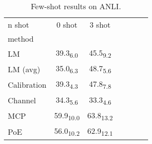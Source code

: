 \begin{table}[h]
\centering
\caption{Few-shot results on ANLI.}
\label{tab:few_shot}
\begin{tabular}{lcccccc}
n shot & 0 shot & 3 shot \\
method &  &  \\
LM & 39.3\textsubscript{6.0} & 45.5\textsubscript{9.2} \\
LM (avg) & 35.0\textsubscript{6.3} & 48.7\textsubscript{5.6} \\
Calibration & 39.3\textsubscript{4.3} & 47.8\textsubscript{7.8} \\
Channel & 34.3\textsubscript{5.6} & 33.3\textsubscript{4.6} \\
MCP & 59.9\textsubscript{10.0} & 63.8\textsubscript{13.2} \\
PoE & 56.0\textsubscript{10.2} & 62.9\textsubscript{12.1} \\
\end{tabular}
\end{table}
